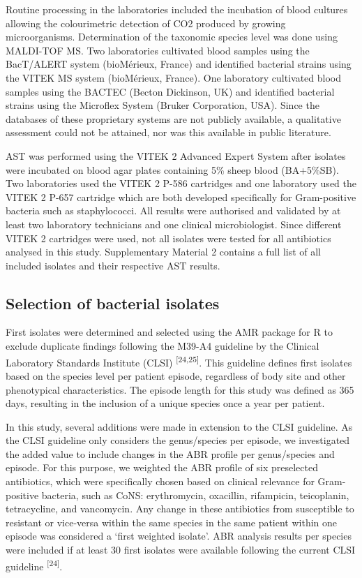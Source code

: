 \documentclass[
]{book}
\begin{document}
Routine processing in the laboratories included the incubation of blood cultures allowing the colourimetric detection of CO2 produced by growing microorganisms. Determination of the taxonomic species level was done using MALDI-TOF MS. Two laboratories cultivated blood samples using the BacT/ALERT system (bioMérieux, France) and identified bacterial strains using the VITEK MS system (bioMérieux, France). One laboratory cultivated blood samples using the BACTEC (Becton Dickinson, UK) and identified bacterial strains using the Microflex System (Bruker Corporation, USA). Since the databases of these proprietary systems are not publicly available, a qualitative assessment could not be attained, nor was this available in public literature.

AST was performed using the VITEK 2 Advanced Expert System after isolates were incubated on blood agar plates containing 5\% sheep blood (BA+5\%SB). Two laboratories used the VITEK 2 P-586 cartridges and one laboratory used the VITEK 2 P-657 cartridge which are both developed specifically for Gram-positive bacteria such as staphylococci. All results were authorised and validated by at least two laboratory technicians and one clinical microbiologist. Since different VITEK 2 cartridges were used, not all isolates were tested for all antibiotics analysed in this study. Supplementary Material 2 contains a full list of all included isolates and their respective AST results.

\hypertarget{selection-of-bacterial-isolates}{%
\subsection{Selection of bacterial isolates}\label{selection-of-bacterial-isolates}}

First isolates were determined and selected using the AMR package for R to exclude duplicate findings following the M39-A4 guideline by the Clinical Laboratory Standards Institute (CLSI) \textsuperscript{{[}24,25{]}}. This guideline defines first isolates based on the species level per patient episode, regardless of body site and other phenotypical characteristics. The episode length for this study was defined as 365 days, resulting in the inclusion of a unique species once a year per patient.

In this study, several additions were made in extension to the CLSI guideline. As the CLSI guideline only considers the genus/species per episode, we investigated the added value to include changes in the ABR profile per genus/species and episode. For this purpose, we weighted the ABR profile of six preselected antibiotics, which were specifically chosen based on clinical relevance for Gram-positive bacteria, such as CoNS: erythromycin, oxacillin, rifampicin, teicoplanin, tetracycline, and vancomycin. Any change in these antibiotics from susceptible to resistant or vice-versa within the same species in the same patient within one episode was considered a `first weighted isolate'. ABR analysis results per species were included if at least 30 first isolates were available following the current CLSI guideline \textsuperscript{{[}24{]}}.
\end{document}
